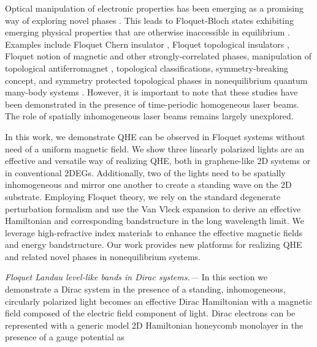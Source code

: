 \documentclass[aps,prb,twocolumn,showpacs,superscriptaddress]{revtex4-2}
\begin{document}
Optical manipulation of electronic properties has been emerging as a promising way of exploring novel phases \cite{AKA, JHM}.
This leads to Floquet-Bloch states exhibiting emerging physical properties that are otherwise inaccessible in equilibrium \cite{LST}.
Examples include Floquet Chern insulator \cite{AGG}, Floquet topological insulators \cite{rudnerBandStructureEngineering2020}, Floquet notion of magnetic and other strongly-correlated phases\cite{rudnerBandStructureEngineering2020}, manipulation of topological antiferromagnet \cite{bielinskiFloquetBlochManipulation2025}, topological classifications, symmetry-breaking concept, and symmetry protected topological phases in nonequilibrium quantum many-body systems \cite{EKM, rudnerBandStructureEngineering2020}.
However, it is important to note that these studies have been demonstrated in the presence of time-periodic homogeneous laser beams.
The role of spatially inhomogeneous laser beams \cite{SWP1, SWP2, SWP3, SWP4, SWP5} remains largely unexplored.

In this work, we demonstrate QHE can be observed in Floquet systems without need of a uniform magnetic field.
We show three linearly polarized lights are an effective and versatile way of realizing QHE, both in graphene-like 2D systems or in conventional 2DEGs.
Additionally, two of the lights need to be spatially inhomogeneous and mirror one another to create a standing wave on the 2D substrate.
Employing Floquet theory, we rely on the standard degenerate perturbation formalism and use the Van Vleck expansion \cite{MBL, AEE} to derive an effective Hamiltonian and corresponding bandstructure in the long wavelength limit.
We leverage high-refractive index materials \cite{shimFundamentalLimitsRefractive2021} to enhance the effective magnetic fields and energy bandstructure.
Our work provides new platforms for realizing QHE and related novel phases in nonequilibrium systems.

\emph{Floquet Landau level-like bands in Dirac systems.---} In this section we demonstrate a Dirac system in the presence of a standing, inhomogeneous, circularly polarized light becomes an effective Dirac Hamiltonian with a magnetic field composed of the electric field component of light.
Dirac electrons can be represented with a generic model 2D Hamiltonian honeycomb monolayer in the presence of a gauge potential as
\end{document}
